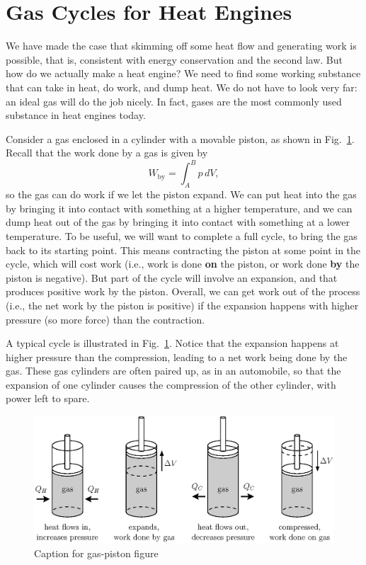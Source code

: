 \section{Gas Cycles for Heat Engines}

We have made the case that skimming off some heat flow and generating
work is possible, that is, consistent with energy conservation and the
second law.  But how do we actually make a heat engine?  We need to
find some working substance that can take in heat, do work, and dump
heat.  We do not have to look very far: an ideal gas will do the job
nicely.  In fact, gases are the most commonly used substance in heat
engines today.

Consider a gas enclosed in a cylinder with a movable piston, as shown
in Fig.~\ref{fig:gas_piston}.  Recall that the work done by a gas is
given by
\begin{equation}
W_\text{by} = \int_A^B p\,dV,
\end{equation}  
so the gas can do work if we let the piston expand.  We can put heat
into the gas by bringing it into contact with something at a higher
temperature, and we can dump heat out of the gas by bringing it into
contact with something at a lower temperature.  To be useful, we will
want to complete a full cycle, to bring the gas back to its starting
point.  This means contracting the piston at some point in the cycle,
which will cost work (i.e., work is done {\bf on} the piston, or
work done {\bf by} the piston is negative).   But part of the cycle
will involve an expansion, and that produces positive work by the
piston.  Overall, we can get work out of the process (i.e., the net 
work by the piston is positive) if the expansion
happens with higher pressure (so more force) than the contraction.

A typical cycle is illustrated in Fig.~\ref{fig:gas_piston}. Notice
that the expansion happens at higher pressure than the compression,
leading to a net work being done by the gas.  These gas cylinders are
often paired up, as in an automobile, so that the expansion of one
cylinder causes the compression of the other cylinder, with power left
to spare.

\begin{figure}
\begin{center}
\includegraphics[width=5.5in]{heat_engines/gas_piston.eps}
\caption{Caption for gas-piston figure}
\label{fig:gas_piston}
\end{center}
\end{figure}

